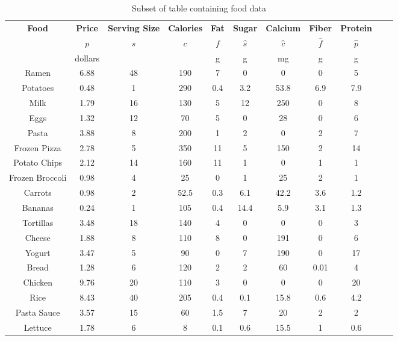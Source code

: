  \begin{table}[H]
\begin{tabular}{|c||c|c|c|c|c|c|c|c|c|c|}
\hline
\textbf{Food} & \textbf{Price} & \textbf{Serving Size} & \textbf{Calories} & \textbf{Fat} & \textbf{Sugar} & \textbf{Calcium} & \textbf{Fiber} & \textbf{Protein} \\ 
& $p$ & $s$ & $c$ & $f$ & $\hat{s}$ & $\hat{c}$ & $\hat{f}$ & $\hat{p}$ \\ 
& dollars & & & g & g & mg & g & g \\ \hline\hline
Ramen & 6.88 & 48 & 190 & 7 & 0 & 0 & 0 & 5 \\ \hline
Potatoes & 0.48 & 1 & 290 & 0.4 & 3.2 & 53.8 & 6.9 & 7.9 \\ \hline
Milk & 1.79 & 16 & 130 & 5 & 12 & 250 & 0 & 8 \\ \hline
Eggs & 1.32 & 12 & 70 & 5 & 0 & 28 & 0 & 6 \\ \hline
Pasta & 3.88 & 8 & 200 & 1 & 2 & 0 & 2 & 7 \\ \hline
Frozen Pizza & 2.78 & 5 & 350 & 11 & 5 & 150 & 2 & 14 \\ \hline
Potato Chips & 2.12 & 14 & 160 & 11 & 1 & 0 & 1 & 1 \\ \hline
Frozen Broccoli & 0.98 & 4 & 25 & 0 & 1 & 25 & 2 & 1 \\ \hline
Carrots & 0.98 & 2 & 52.5 & 0.3 & 6.1 & 42.2 & 3.6 & 1.2 \\ \hline
Bananas & 0.24 & 1 & 105 & 0.4 & 14.4 & 5.9 & 3.1 & 1.3 \\ \hline
Tortillas & 3.48 & 18 & 140 & 4 & 0 & 0 & 0 & 3 \\ \hline
Cheese & 1.88 & 8 & 110 & 8 & 0 & 191 & 0 & 6 \\ \hline
Yogurt & 3.47 & 5 & 90 & 0 & 7 & 190 & 0 & 17 \\ \hline
Bread & 1.28 & 6 & 120 & 2 & 2 & 60 & 0.01 & 4 \\ \hline
Chicken & 9.76 & 20 & 110 & 3 & 0 & 0 & 0 & 20 \\ \hline
Rice & 8.43 & 40 & 205 & 0.4 & 0.1 & 15.8 & 0.6 & 4.2 \\ \hline
Pasta Sauce & 3.57 & 15 & 60 & 1.5 & 7 & 20 & 2 & 2 \\ \hline
Lettuce & 1.78 & 6 & 8 & 0.1 & 0.6 & 15.5 & 1 & 0.6 \\ \hline
\end{tabular}
\caption{Subset of table containing food data}
\label{tab:food-data}
\end{table}

